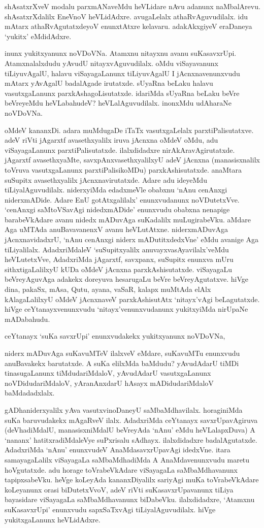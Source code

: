 shAsatxrXveV modalu parxmANaveMdu heVLidare nAvu adanunx naMbalArevu. shAsatxrXdalilx EneVnoV heVLidAdxre. avugaLelalx athaRvAguvudilalx. idu mAtarx athaRvAgutatxdeyoV enunxtAtxre kelavaru. adakAkxgiyeV eraDaneya `yukitx' eMdidAdxre.

inunx yukitxyanunx noVDoVNa. Atamxnu nitayxnu avanu suKasavxrUpi. Atamxnalalxdudu yAvudU nitayxvAguvudilalx. oMdu viSayavanunx tiLiyuvAgalU, halavu viSayagaLanunx tiLiyuvAgalU I jAcnxnavenunxvudu mAtarx yAvAgalU badalAgade irutatxde. sUyaRna beLaku halavu vasutxgaLanunx parxkAshagoLisutatxde. idariMda sUyaRna beLaku beVre beVreyeMdu heVLabahudeV? heVLalAguvudilalx. inonxMdu udAharaNe noVDoVNa.

oMdeV kananxDi. adara muMdugaDe iTaTx vasutxgaLelalx parxtiPalisutatxve. adeV riVti jAgarxtf avasethxyalilx iruva jAcnxna oMdeV oMdu, adu viSayagaLanunx parxtiPalisutatxde. ilalxdidadxre nirAkAravAgirutatxde. jAgarxtf avasethxyaMte, savxpAnxvasethxyalilxyU adeV jAcnxna (manasisxnalilx toVruva vasutxgaLanunx parxtiPalisikoMDu) parxkAshisutatxde. anaMtara suSupitx avasethxyalilx jAcnxnavirutatxde. Adare adu ideyeMdu tiLiyalAguvudilalx. niderxyiMda edadxmeVle obabxnu `nAnu cenAnxgi niderxmADide. Adare EnU gotAtxgalilalx' enunxvudanunx noVDutetxVve. `cenAnxgi saMtoVSavAgi nidedxmADide' enunxvudu obabxna nenapige barabeVkAdare avanu nidedx mADuvAga suKadalilx muLugirabeVku. aMdare Aga uMTAda anuBavavanenxV avanu heVLutAtxne. niderxmADuvAga jAcnxnavidadxrU, `nAnu cenAnxgi niderx mADutitxdedxVne' eMdu avanige Aga tiLiyalilalx. AdadxriMdaleV `suSupitxyalilx anuvayxvasAyavilalx'veMdu heVLutetxVve, AdadxriMda jAgarxtf, savxpanx, suSupitx enunxva mUru sithxtigaLalilxyU kUDa oMdeV jAcnxna parxkAshisutatxde. viSayagaLu beVreyAguvAga adakekx doreyuva hesarugaLu beVre beVreyAgutatxve. hiVge dina, pakaSx, mAsa, Qutu, ayana, vaSaR, kalapx muMtAda elAlx kAlagaLalilxyU oMdeV jAcnxnaveV parxkAshisutAtx `nitayx'vAgi beLagutatxde. hiVge ceYtanayxvenunxvudu `nitayx'venunxvudanunx yukitxyiMda nirUpaNe mADabahudu.

ceYtanayx `suKa savxrUpi' enunxvudakekx yukitxyanunx noVDoVNa,

niderx mADuvAga suKavuMTeV ilalxveV eMdare, suKavuMTu enunxvudu anuBavakekx barutatxde. A suKa elilxMda baMdudu? yAvudAdarU tiMDi tinasugaLanunx tiMdudariMdaloV, yAvudAdarU vasutxgaLanunx noVDidudariMdaloV, yAranAnxdarU hAsayx mADidudariMdaloV baMdadadxlalx.

gADhaniderxyalilx yAva vasutxvinoDaneyU saMbaMdhavilalx. horaginiMda suKa baruvudakekx mAgaRveV ilalx. AdadxriMda ceYtanayx savxrUpavAgiruva (deVhadiMdalU, manasisxniMdalU beVreyAda `nAnu' eMdu heVLalapxDuva) A `nananx' hatitxradiMdaleVye suPxrisalu sAdhayx. ilalxdidadxre badalAgutatxde. AdadxriMda `nAnu' enunxvudeV AnaMdasavxrUpavAgi idedxVne. itara samayagaLalilx viSayagaLa saMbaMdhadiMda A AnaMdavenunxvudu maretu hoVgutatxde. adu horage toVrabeVkAdare viSayagaLa saMbaMdhavanunx tapipxsabeVku. heVge koLeyAda kananxDiyalilx sariyAgi muKa toVrabeVkAdare koLeyanunx orasi biDutetxVvoV, adeV riVti suKasavxrUpavanunx tiLiya bayasidare viSayagaLa saMbaMdhavanunx biDabeVku. ilalxdidadxre, `Atamxnu suKasavxrUpi' enunxvudu sapxSaTxvAgi tiLiyalAguvudilalx. hiVge yukitxgaLanunx heVLidAdxre.

